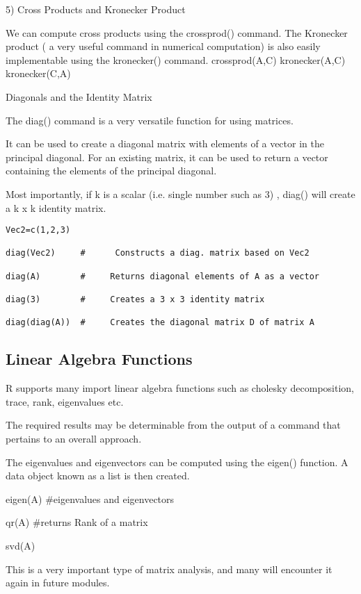 5) Cross Products and Kronecker Product

We can compute cross products using the crossprod() command. The Kronecker product ( a very useful command in numerical computation) is also easily implementable using the kronecker() command.
crossprod(A,C)
kronecker(A,C)
kronecker(C,A)

Diagonals and the Identity Matrix

The diag() command is a very versatile function for using matrices.

It can be used to create a diagonal matrix with elements of a vector in the principal diagonal. For an existing matrix, it can be used to return a vector containing the elements of the principal diagonal. 

Most importantly, if k is a scalar (i.e. single number such as 3) , diag() will create a k x k identity matrix.

\begin{verbatim}
Vec2=c(1,2,3)

diag(Vec2)     #      Constructs a diag. matrix based on Vec2

diag(A)        #     Returns diagonal elements of A as a vector

diag(3)        #     Creates a 3 x 3 identity matrix

diag(diag(A))  #     Creates the diagonal matrix D of matrix A 

\end{verbatim} 
\subsection{Linear Algebra Functions}

R supports many import linear algebra functions such as cholesky decomposition, trace, rank, eigenvalues etc.

The required results may be determinable from the output of a command that pertains to an overall approach.

The eigenvalues and eigenvectors can be computed using the eigen() function.  A data object known as a list is then created.


eigen(A)       #eigenvalues and eigenvectors       
                                                                 
qr(A)          #returns Rank of a matrix

svd(A)

This is a very important type of matrix analysis, and many will encounter it again in future modules.


